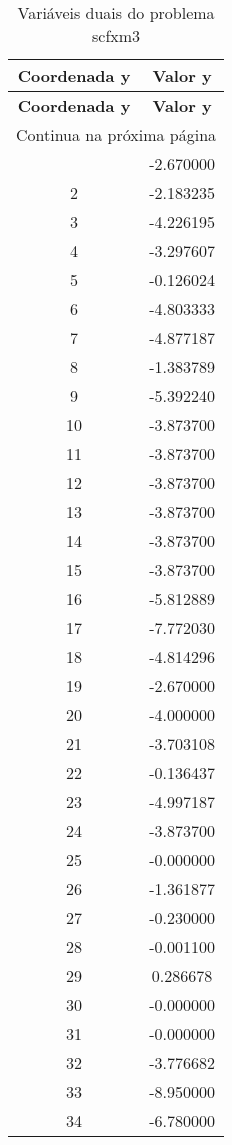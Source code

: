 \documentclass[12pt]{article}
\begin{document}
\begin{longtable}{@{}cc@{}}
\caption{Variáveis duais do problema scfxm3} \\
\toprule
\textbf{Coordenada y} & \textbf{Valor y} \\
\midrule
\endfirsthead

\toprule
\textbf{Coordenada y} & \textbf{Valor y} \\
\midrule
\endhead

\midrule \multicolumn{2}{r}{{Continua na próxima página}} \\ \midrule
\endfoot

\bottomrule
\endlastfoot
1 & -2.670000 \\
2 & -2.183235 \\
3 & -4.226195 \\
4 & -3.297607 \\
5 & -0.126024 \\
6 & -4.803333 \\
7 & -4.877187 \\
8 & -1.383789 \\
9 & -5.392240 \\
10 & -3.873700 \\
11 & -3.873700 \\
12 & -3.873700 \\
13 & -3.873700 \\
14 & -3.873700 \\
15 & -3.873700 \\
16 & -5.812889 \\
17 & -7.772030 \\
18 & -4.814296 \\
19 & -2.670000 \\
20 & -4.000000 \\
21 & -3.703108 \\
22 & -0.136437 \\
23 & -4.997187 \\
24 & -3.873700 \\
25 & -0.000000 \\
26 & -1.361877 \\
27 & -0.230000 \\
28 & -0.001100 \\
29 & 0.286678 \\
30 & -0.000000 \\
31 & -0.000000 \\
32 & -3.776682 \\
33 & -8.950000 \\
34 & -6.780000 \\

\end{longtable}
\end{document}
